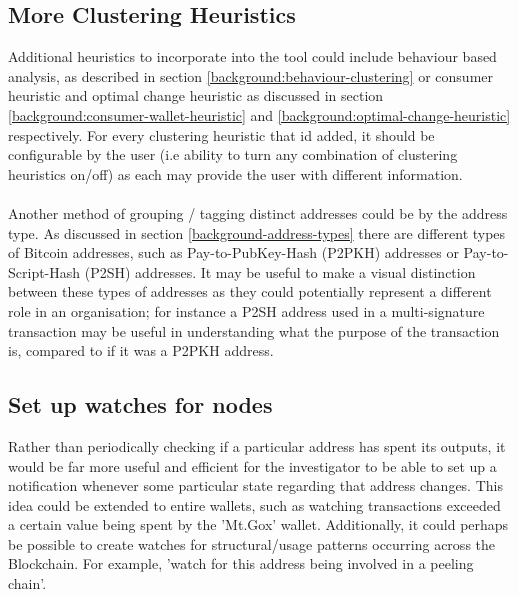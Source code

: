 \subsection{More Clustering Heuristics}
Additional heuristics to incorporate into the tool could include behaviour based analysis, as described in section \ref{background:behaviour-clustering} or consumer heuristic and optimal change heuristic as discussed in section 
\ref{background:consumer-wallet-heuristic} and \ref{background:optimal-change-heuristic} respectively. For every clustering heuristic that id added, it should be configurable by the user (i.e ability to turn any combination of clustering heuristics on/off) as each may provide the user with different information. 
\\\\
Another method of grouping / tagging distinct addresses could be by the address type. As discussed in section \ref{background-address-types} there are different types of Bitcoin addresses, such as Pay-to-PubKey-Hash (P2PKH) addresses or Pay-to-Script-Hash (P2SH) addresses. It may be useful to make a visual distinction between these types of addresses as they could potentially represent a different role in an organisation; for instance a P2SH address used in a multi-signature transaction may be useful in understanding what the purpose of the transaction is, compared to if it was a P2PKH address. 

\subsection{Set up watches for nodes}
Rather than periodically checking if a particular address has spent its outputs, it would be far more useful and efficient for the investigator to be able to set up a notification whenever some particular state regarding that address changes. This idea could be extended to entire wallets, such as watching transactions exceeded a certain value being spent by the 'Mt.Gox' wallet. Additionally, it could perhaps be possible to create watches for structural/usage patterns occurring across the Blockchain. For example, 'watch for this address being involved in a peeling chain'. 

